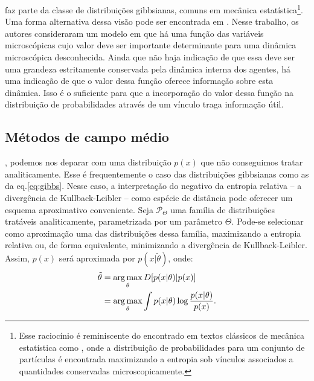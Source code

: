  faz parte da classe de distribuições gibbsianas, comuns em mecânica estatística\footnote[][-5cm]{Esse raciocínio é reminiscente do encontrado em textos clássicos de mecânica estatística como \citet{Landau1980}, onde a distribuição de probabilidades para um conjunto de partículas é encontrada maximizando a entropia sob vínculos associados a quantidades conservadas microscopicamente.}\cite{Landau1980}. Uma forma alternativa dessa visão pode ser encontrada\cite{NCaticha2011} em \citet{NCaticha2011}. Nesse trabalho, os autores consideraram um modelo em que há uma função das variáveis microscópicas cujo valor deve ser importante determinante para uma dinâmica microscópica desconhecida. Ainda que não haja indicação de que essa deve ser uma grandeza estritamente conservada pela dinâmica interna dos agentes, há uma indicação de que o valor dessa função oferece informação sobre esta dinâmica. Isso é o suficiente para que a incorporação do valor dessa função na distribuição de probabilidades através de um vínculo traga informação útil. 

\subsection{Métodos de campo médio}
\label{sec:meanfield}
, podemos nos deparar com uma distribuição $p(x)$ que não conseguimos tratar analiticamente. Esse é frequentemente o caso das distribuições gibbsianas como as da eq.\eqref{eq:gibbs}. Nesse caso, a interpretação do negativo da entropia relativa -- a divergência de Kullback-Leibler -- como espécie de distância pode oferecer um esquema aproximativo conveniente. Seja $\mathcal{P}_\Theta$ uma família de distribuições tratáveis analiticamente, parametrizada por um parâmetro $\Theta$. Pode-se selecionar como aproximação uma das distribuições dessa família, maximizando a entropia relativa ou, de forma equivalente, minimizando a divergência de Kullback-Leibler. Assim, $p(x)$ será aproximada por $p(x | \tilde{\theta})$, onde:
\begin{align}
\tilde{\theta} &= \operatorname*{arg\,max}_{\theta} D[ p(x|\theta)|p(x) ] \nonumber \\ &= \operatorname*{arg\,max}_{\theta} \int p(x|\theta) \log\frac{p(x|\theta)}{p(x)}.\nonumber
\end{align}


